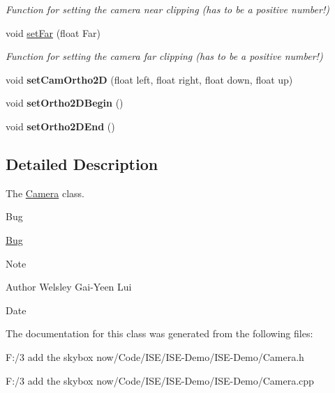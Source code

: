 \begin{DoxyCompactItemize}
\begin{DoxyCompactList}\small\item\em Function for setting the camera near clipping (has to be a positive number!) \end{DoxyCompactList}\item 
\hypertarget{class_camera_a329cba7e3a6eeba957c9751007fc675e}{void \hyperlink{class_camera_a329cba7e3a6eeba957c9751007fc675e}{set\-Far} (float Far)}\label{class_camera_a329cba7e3a6eeba957c9751007fc675e}

\begin{DoxyCompactList}\small\item\em Function for setting the camera far clipping (has to be a positive number!) \end{DoxyCompactList}\item 
\hypertarget{class_camera_add35feeba6d994afcd9c3ed6d6a25929}{void {\bfseries set\-Cam\-Ortho2\-D} (float left, float right, float down, float up)}\label{class_camera_add35feeba6d994afcd9c3ed6d6a25929}

\item 
\hypertarget{class_camera_ade08194ea0d5b01fe913d6d22b78fa4a}{void {\bfseries set\-Ortho2\-D\-Begin} ()}\label{class_camera_ade08194ea0d5b01fe913d6d22b78fa4a}

\item 
\hypertarget{class_camera_a41a854c5eccc8b2f8463e2ffbb5b628e}{void {\bfseries set\-Ortho2\-D\-End} ()}\label{class_camera_a41a854c5eccc8b2f8463e2ffbb5b628e}

\end{DoxyCompactItemize}


\subsection{Detailed Description}
The \hyperlink{class_camera}{Camera} class. 

\begin{DoxyRefDesc}{Bug}
\item[\hyperlink{bug__bug000002}{Bug}]\end{DoxyRefDesc}
\begin{DoxyNote}{Note}

\end{DoxyNote}
\begin{DoxyAuthor}{Author}
Welsley Gai-\/\-Yeen Lui 
\end{DoxyAuthor}
\begin{DoxyDate}{Date}

\end{DoxyDate}


The documentation for this class was generated from the following files\-:\begin{DoxyCompactItemize}
\item 
F\-:/3 add the skybox now/\-Code/\-I\-S\-E/\-I\-S\-E-\/\-Demo/\-I\-S\-E-\/\-Demo/Camera.\-h\item 
F\-:/3 add the skybox now/\-Code/\-I\-S\-E/\-I\-S\-E-\/\-Demo/\-I\-S\-E-\/\-Demo/Camera.\-cpp\end{DoxyCompactItemize}

